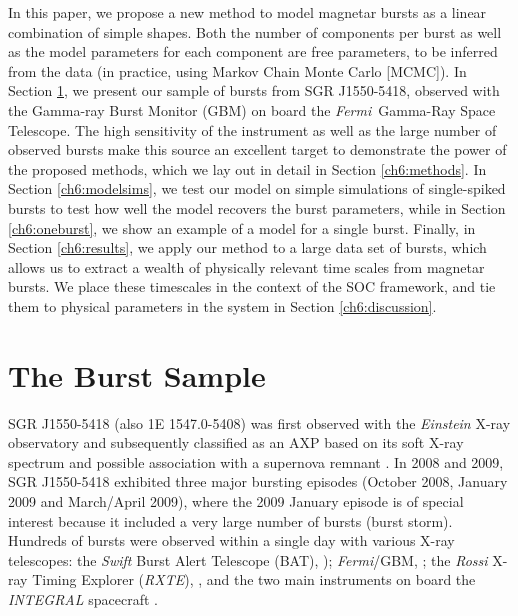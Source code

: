 \documentclass[12pt]{emulateapj}
\newcommand{\project}[1]{\textsl{#1}}
\newcommand{\fermi}{\project{Fermi}}
\newcommand{\rxte}{\project{RXTE}}
\begin{document}
In this paper, we propose a new method to model magnetar bursts as a linear combination of simple shapes. Both the number of components
per burst as well as the model parameters for each component are free parameters, to be inferred from the data (in practice, using
Markov Chain Monte Carlo [MCMC]). In Section \ref{ch6:data}, we present our sample of bursts from SGR J1550-5418, observed with the 
Gamma-ray Burst Monitor (GBM) on board the \fermi\ Gamma-Ray Space Telescope.
The high sensitivity of the instrument as well as 
the large number of observed bursts make this source an excellent target to demonstrate the power of the proposed methods, which we
lay out in detail in Section \ref{ch6:methods}.
In Section \ref{ch6:modelsims}, we test our model on simple simulations of single-spiked bursts to test how well the model recovers the burst parameters, while
in Section \ref{ch6:oneburst}, we show an example of a model for a single burst. Finally, in Section \ref{ch6:results}, we apply our method to a large data set of bursts, 
which allows us to extract a wealth of physically relevant time scales from magnetar bursts. 
We place these timescales in the context of the SOC framework, and tie them to physical parameters in the system in Section \ref{ch6:discussion}.


\section{The Burst Sample}
\label{ch6:data}

SGR J1550-5418 (also 1E 1547.0-5408) was first observed with the {\it Einstein} X-ray observatory \citep{lamb1981}
and subsequently classified as an AXP based on its soft X-ray spectrum and possible association with a supernova remnant \citep{gelfand2007}.
In 2008 and 2009, SGR J1550-5418 exhibited three major bursting episodes (October 2008, January 2009 and March/April 2009), where the 2009 January episode is of special interest 
because it included a very large number of bursts (burst storm). Hundreds of bursts were observed within a single day with various X-ray telescopes: 
the \project{Swift} Burst Alert Telescope (BAT), \citep{israel2010, scholz2011}); \fermi/GBM, \citep{kaneko2010,vonkienlin2012,vanderhorst2012}; the \project{Rossi} 
X-ray Timing Explorer (\rxte), \citep{dib2012}, and the two main instruments on board the \project{INTEGRAL} spacecraft \citep{mereghetti2009, savchenko2010}.
 
\end{document}

